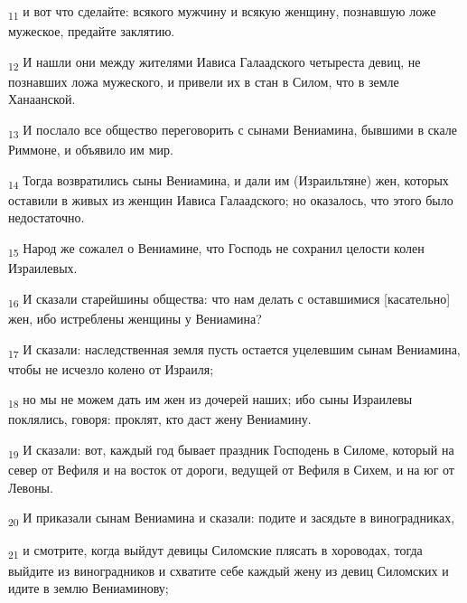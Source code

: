 \begin{tcolorbox}
\textsubscript{11} и вот что сделайте: всякого мужчину и всякую женщину, познавшую ложе мужеское, предайте заклятию.
\end{tcolorbox}
\begin{tcolorbox}
\textsubscript{12} И нашли они между жителями Иависа Галаадского четыреста девиц, не познавших ложа мужеского, и привели их в стан в Силом, что в земле Ханаанской.
\end{tcolorbox}
\begin{tcolorbox}
\textsubscript{13} И послало все общество переговорить с сынами Вениамина, бывшими в скале Риммоне, и объявило им мир.
\end{tcolorbox}
\begin{tcolorbox}
\textsubscript{14} Тогда возвратились сыны Вениамина, и дали им (Израильтяне) жен, которых оставили в живых из женщин Иависа Галаадского; но оказалось, что этого было недостаточно.
\end{tcolorbox}
\begin{tcolorbox}
\textsubscript{15} Народ же сожалел о Вениамине, что Господь не сохранил целости колен Израилевых.
\end{tcolorbox}
\begin{tcolorbox}
\textsubscript{16} И сказали старейшины общества: что нам делать с оставшимися [касательно] жен, ибо истреблены женщины у Вениамина?
\end{tcolorbox}
\begin{tcolorbox}
\textsubscript{17} И сказали: наследственная земля пусть остается уцелевшим сынам Вениамина, чтобы не исчезло колено от Израиля;
\end{tcolorbox}
\begin{tcolorbox}
\textsubscript{18} но мы не можем дать им жен из дочерей наших; ибо сыны Израилевы поклялись, говоря: проклят, кто даст жену Вениамину.
\end{tcolorbox}
\begin{tcolorbox}
\textsubscript{19} И сказали: вот, каждый год бывает праздник Господень в Силоме, который на север от Вефиля и на восток от дороги, ведущей от Вефиля в Сихем, и на юг от Левоны.
\end{tcolorbox}
\begin{tcolorbox}
\textsubscript{20} И приказали сынам Вениамина и сказали: подите и засядьте в виноградниках,
\end{tcolorbox}
\begin{tcolorbox}
\textsubscript{21} и смотрите, когда выйдут девицы Силомские плясать в хороводах, тогда выйдите из виноградников и схватите себе каждый жену из девиц Силомских и идите в землю Вениаминову;
\end{tcolorbox}
